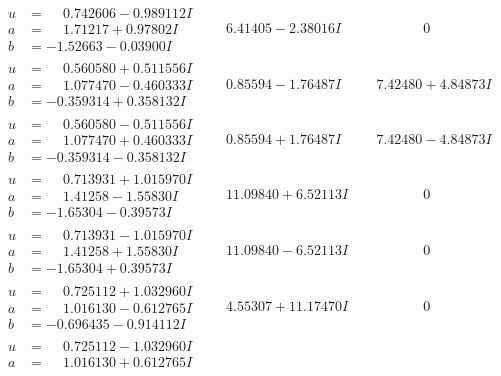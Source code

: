 \documentclass[1p]{elsarticle_modified}
\theoremstyle{definition}
\begin{document}
$$\begin{array}{c|c|c}
\begin{aligned}
u &= \phantom{-}0.742606 - 0.989112 I \\
a &= \phantom{-}1.71217 + 0.97802 I \\
b &= -1.52663 - 0.03900 I\end{aligned}
 & \phantom{-}6.41405 - 2.38016 I & \phantom{-0.000000 } 0 \\ \hline\begin{aligned}
u &= \phantom{-}0.560580 + 0.511556 I \\
a &= \phantom{-}1.077470 - 0.460333 I \\
b &= -0.359314 + 0.358132 I\end{aligned}
 & \phantom{-}0.85594 - 1.76487 I & \phantom{-}7.42480 + 4.84873 I \\ \hline\begin{aligned}
u &= \phantom{-}0.560580 - 0.511556 I \\
a &= \phantom{-}1.077470 + 0.460333 I \\
b &= -0.359314 - 0.358132 I\end{aligned}
 & \phantom{-}0.85594 + 1.76487 I & \phantom{-}7.42480 - 4.84873 I \\ \hline\begin{aligned}
u &= \phantom{-}0.713931 + 1.015970 I \\
a &= \phantom{-}1.41258 - 1.55830 I \\
b &= -1.65304 - 0.39573 I\end{aligned}
 & \phantom{-}11.09840 + 6.52113 I & \phantom{-0.000000 } 0 \\ \hline\begin{aligned}
u &= \phantom{-}0.713931 - 1.015970 I \\
a &= \phantom{-}1.41258 + 1.55830 I \\
b &= -1.65304 + 0.39573 I\end{aligned}
 & \phantom{-}11.09840 - 6.52113 I & \phantom{-0.000000 } 0 \\ \hline\begin{aligned}
u &= \phantom{-}0.725112 + 1.032960 I \\
a &= \phantom{-}1.016130 - 0.612765 I \\
b &= -0.696435 - 0.914112 I\end{aligned}
 & \phantom{-}4.55307 + 11.17470 I & \phantom{-0.000000 } 0 \\ \hline\begin{aligned}
u &= \phantom{-}0.725112 - 1.032960 I \\
a &= \phantom{-}1.016130 + 0.612765 I \\

\end{aligned}
\end{array}$$
\end{document}

